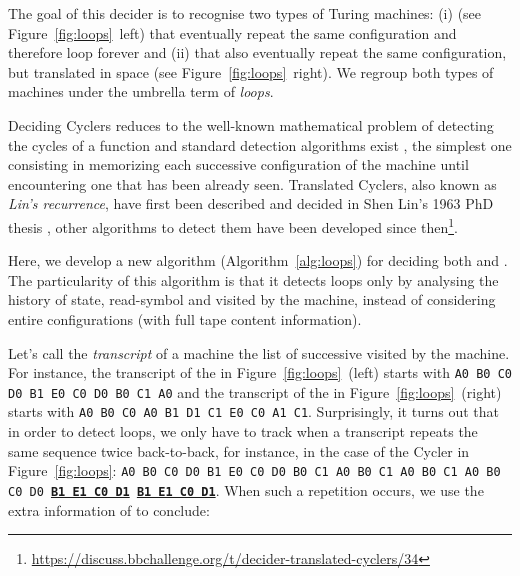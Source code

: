 
The goal of this decider is to recognise two types of Turing machines: (i) \textit{\cyclers} (see Figure~\ref{fig:loops}~left) that eventually repeat the same configuration and therefore loop forever and (ii) \textit{\TCs} that also eventually repeat the same configuration, but translated in space (see Figure~\ref{fig:loops}~right). We regroup both types of machines under the umbrella term of \textit{loops}.

Deciding Cyclers reduces to the well-known mathematical problem of detecting the cycles of a function and standard detection algorithms exist \cite{wiki:Cycle_detection}, the simplest one consisting in memorizing each successive configuration of the machine until encountering one that has been already seen. Translated Cyclers, also known as \textit{Lin's recurrence}, have first been described and decided in Shen Lin's 1963 PhD thesis \cite{Lin1963}, other algorithms to detect them have been developed since then\footnote{\url{https://discuss.bbchallenge.org/t/decider-translated-cyclers/34}}.

Here, we develop a new algorithm (Algorithm~\ref{alg:loops}) for deciding both \cyclers and \TCs. The particularity of this algorithm is that it detects loops only by analysing the history of state, read-symbol and \headposs visited by the machine, instead of considering entire configurations (\ie with full tape content information).

Let's call the \textit{transcript} of a machine the list of successive \ssps visited by the machine. For instance, the transcript of the \cycler in Figure~\ref{fig:loops}~(left) starts with \texttt{A0 B0 C0 D0 B1 E0 C0 D0 B0 C1 A0} and the transcript of the \TC in Figure~\ref{fig:loops}~(right) starts with \texttt{A0 B0 C0 A0 B1 D1 C1 E0 C0 A1 C1}. Surprisingly, it turns out that in order to detect loops, we only have to track when a transcript repeats the same sequence twice back-to-back, for instance, in the case of the Cycler in Figure~\ref{fig:loops}: \texttt{A0 B0 C0 D0 B1 E0 C0 D0 B0 C1 A0 B0 C1 A0 B0 C1 A0 B0 C0 D0 \textbf{\underline{B1 E1 C0 D1}} \textbf{\underline{B1 E1 C0 D1}}}. When such a repetition occurs, we use the extra information of \headpos to conclude:

